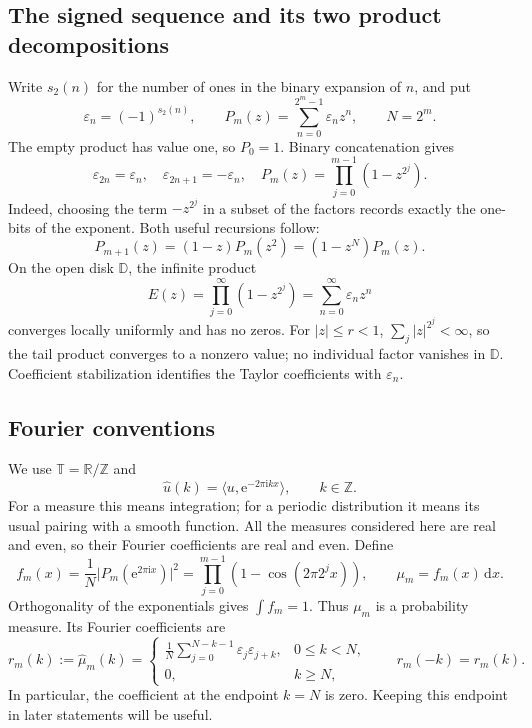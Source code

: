 \documentclass[11pt,a4paper]{article}
\numberwithin{equation}{section}
\theoremstyle{definition}
\theoremstyle{remark}
\newcommand{\eps}{\varepsilon}
\newcommand{\T}{\mathbb T}
\newcommand{\Z}{\mathbb Z}
\newcommand{\R}{\mathbb R}
\newcommand{\D}{\mathbb D}
\newcommand{\dd}{\,\mathrm d}
\newcommand{\ee}{\mathrm e}
\newcommand{\ii}{\mathrm i}
\newcommand{\pair}[2]{\langle #1,#2\rangle}
\newcommand{\abs}[1]{\lvert #1\rvert}
\begin{document}
\subsection{The signed sequence and its two product decompositions}
Write $s_2(n)$ for the number of ones in the binary expansion of $n$, and put
\begin{equation}
 \eps_n=(-1)^{s_2(n)},\qquad
 P_m(z)=\sum_{n=0}^{2^m-1}\eps_nz^n,\qquad N=2^m.
 \label{eq:definitions}
\end{equation}
The empty product has value one, so $P_0=1$. Binary concatenation gives
\begin{equation}
 \eps_{2n}=\eps_n,\quad \eps_{2n+1}=-\eps_n,\quad
 P_m(z)=\prod_{j=0}^{m-1}(1-z^{2^j}).
 \label{eq:binary}
\end{equation}
Indeed, choosing the term $-z^{2^j}$ in a subset of the factors records exactly
the one-bits of the exponent. Both useful recursions follow:
\begin{equation}
 P_{m+1}(z)=(1-z)P_m(z^2)=(1-z^N)P_m(z).
 \label{eq:two-product}
\end{equation}
On the open disk $\D$, the infinite product
\begin{equation}
 E(z)=\prod_{j=0}^{\infty}(1-z^{2^j})
     =\sum_{n=0}^{\infty}\eps_nz^n
 \label{eq:E}
\end{equation}
converges locally uniformly and has no zeros. For $|z|\le r<1$,
$\sum_j|z|^{2^j}<\infty$, so the tail product converges to a nonzero value;
no individual factor vanishes in $\D$. Coefficient stabilization identifies the
Taylor coefficients with $\eps_n$.

\subsection{Fourier conventions}
We use $\T=\R/\Z$ and
\begin{equation}
 \widehat u(k)=\pair{u}{\ee^{-2\pi\ii kx}},\qquad k\in\Z.
 \label{eq:fourier}
\end{equation}
For a measure this means integration; for a periodic distribution it means its
usual pairing with a smooth function. All the measures considered here are real
and even, so their Fourier coefficients are real and even. Define
\begin{equation}
 f_m(x)=\frac1N\abs{P_m(\ee^{2\pi\ii x})}^2
       =\prod_{j=0}^{m-1}(1-\cos(2\pi2^jx)),\qquad
 \mu_m=f_m(x)\dd x.
 \label{eq:fm}
\end{equation}
Orthogonality of the exponentials gives $\int f_m=1$. Thus $\mu_m$ is a
probability measure. Its Fourier coefficients are
\begin{equation}
 r_m(k):=\widehat\mu_m(k)
 =\begin{cases}
 \displaystyle\frac1N\sum_{j=0}^{N-k-1}\eps_j\eps_{j+k},&0\le k<N,\\
 0,&k\ge N,
 \end{cases}\qquad r_m(-k)=r_m(k).
 \label{eq:aperiodic}
\end{equation}
In particular, the coefficient at the endpoint $k=N$ is zero. Keeping this
endpoint in later statements will be useful.
\end{document}
